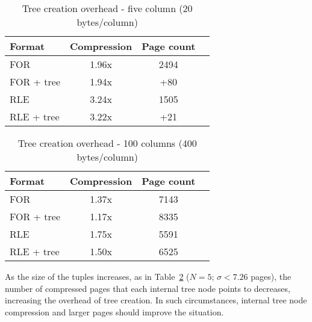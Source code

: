 \documentclass{sig-alternate-sigmod08}
\begin{document}
\begin{table}
\caption{Tree creation overhead - five column (20 bytes/column)}
\centering
\label{table:treeCreation}
\begin{tabular}{|l|c|c|c|} \hline
Format     & Compression & Page count \\ \hline %
FOR        & 1.96x       & 2494       \\ \hline %
FOR + tree & 1.94x       & +80        \\ \hline %
RLE        & 3.24x       & 1505 \\ \hline %
RLE + tree & 3.22x       & +21        \\  %
\hline\end{tabular}
\end{table}
\begin{table}
\caption{Tree creation overhead - 100 columns (400 bytes/column)}
\centering
\label{table:treeCreationTwo}
\begin{tabular}{|l|c|c|c|} \hline
Format     & Compression & Page count \\ \hline %
FOR        & 1.37x       & 7143       \\ \hline %
FOR + tree & 1.17x       & 8335        \\ \hline %
RLE        & 1.75x       & 5591 \\ \hline %
RLE + tree & 1.50x       & 6525        \\  %

\hline\end{tabular}
\end{table}

As the size of the tuples increases, as in
Table~\ref{table:treeCreationTwo} ($N=5$; $\sigma < 7.26$ pages), the
number of compressed pages that each internal tree node points to
decreases, increasing the overhead of tree creation.  In such
circumstances, internal tree node compression and larger pages should
improve the situation.
\end{document}
